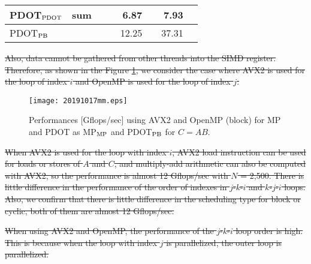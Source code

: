 \documentclass{IOS-Book-Article}
\begin{document}
\begin{table}[htbp]
\begin{tabular}{l||c|r|r|r|r|r|r}
    PDOT$_{\rm{PDOT}}$& sum      &                            &                          & 6.87                       &                                                                             & 7.93                                                                        &                                                                                      \\ \hline
    PDOT$_{\rm{PB}}$   &          &                            &                          & 12.25                      &                                                                             & 37.31                                                                       &                                                                              \\ \hline       
    \end{tabular}
    \end{table}

\sout{Also, data cannot be gathered from other threads into the SIMD register.
Therefore, as shown in the Figure \ref{figMM3}, we consider the case where AVX2 is used for the loop of index $i$ and OpenMP is used for the loop of index $j$.}

\begin{figure}[htbp]
    \begin{center}
      \texttt{[image: 20191017mm.eps]}
           \caption{Performances [Gflops/sec] using AVX2 and OpenMP (block) for MP and PDOT as MP$_{\rm{MP}}$ and PDOT$_{\rm{PB}}$ for $C = AB$. {\color{mid}{凡例直す。図はこれで良いのか？}}}
      \label{figMM3}
    \end{center}
  \end{figure}
  
\sout{When AVX2 is used for the loop with index $i$, AVX2 load instruction can be used for loads or stores of $A$ and $C$, and multiply-add arithmetic can also be computed with AVX2, so the performance is almost 12 Gflops/sec with $N$ = 2,500. There is little difference in the performance of the order of indexes in $j$-$k$-$i$ and $k$-$j$-$i$ loops. Also, we confirm that there is little difference in the scheduling type for block or cyclic, both of them are almost 12 Gflops/sec. }

{\color{mid}{When using AVX2 for the most inner loop, $vmuladd$, $vload$, and $vstore$ can be used, so the performance is higher almost four times than without parallelization for both MP and PDOT.}}

\sout{When using AVX2 and OpenMP, the performance of the $j$-$k$-$i$ loop order is high. This is because when the loop with index $j$ is parallelized, the outer loop is parallelized.}
\end{document}

